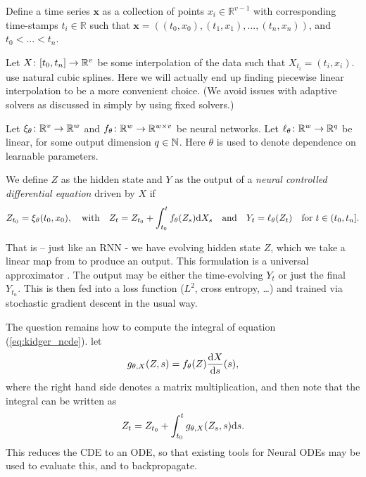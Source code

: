 Define a time series $\mathbf{x}$ as a collection of points $x_i \in \mathbb{R}^{v-1}$ with corresponding time-stamps $t_i \in \mathbb{R}$ such that $\mathbf{x} = ((t_0, x_0), (t_1, x_1), ..., (t_n, x_n))$, and $t_0 < ... < t_n$.

Let $X \colon [t_0, t_n] \to \mathbb{R}^{v}$ be some interpolation of the data such that $X_{t_i} = (t_i, x_i)$. \citet{kidger2020neural} use natural cubic splines. Here we will actually end up finding piecewise linear interpolation to be a more convenient choice. (We avoid issues with adaptive solvers as discussed in \citet[Appendix A]{kidger2020neural} simply by using fixed solvers.) %

Let $\xi_\theta \colon \mathbb{R}^{v} \to \mathbb{R}^w$ and $f_\theta \colon \mathbb{R}^w \to \mathbb{R}^{w \times v}$ be neural networks. Let $\ell_\theta \colon \mathbb{R}^w \to \mathbb{R}^{q}$ be linear, for some output dimension $q \in \mathbb{N}$. Here $\theta$ is used to denote dependence on learnable parameters.

We define $Z$ as the hidden state and $Y$ as the output of a \textit{neural controlled differential equation} driven by $X$ if
\begin{equation}
    Z_{t_0} = \xi_\theta(t_0, x_0), \quad \text{with} \quad  Z_t = Z_{t_0} + \int^{t}_{t_0} f_\theta(Z_s) \mathrm{d} X_s \quad \text{and} \quad Y_t = \ell_\theta(Z_t) \quad \text{for } t \in (t_0, t_n].
    \label{eq:kidger_ncde}
\end{equation}

That is -- just like an RNN - we have evolving hidden state $Z$, which we take a linear map from to produce an output. This formulation is a universal approximator \citep[Appendix B]{kidger2020neural}. The output may be either the time-evolving $Y_t$ or just the final $Y_{t_n}$. This is then fed into a loss function ($L^2$, cross entropy, \ldots) and trained via stochastic gradient descent in the usual way.

The question remains how to compute the integral of equation (\ref{eq:kidger_ncde}). \citet{kidger2020neural} let
\begin{equation}
    g_{\theta, X}(Z, s) = f_\theta(Z) \frac{\mathrm{d} X}{\mathrm{d} s}(s),
    \label{eq:kidger_g_X}
\end{equation}
where the right hand side denotes a matrix multiplication, and then note that the integral can be written as
\begin{equation}
     Z_t = Z_{t_0} + \int^{t}_{t_0} g_{\theta, X}(Z_s, s) \mathrm{d} s.
     \label{eq:kidger_cde_evaluation}
\end{equation}
This reduces the CDE to an ODE, so that existing tools for Neural ODEs may be used to evaluate this, and to backpropagate.

